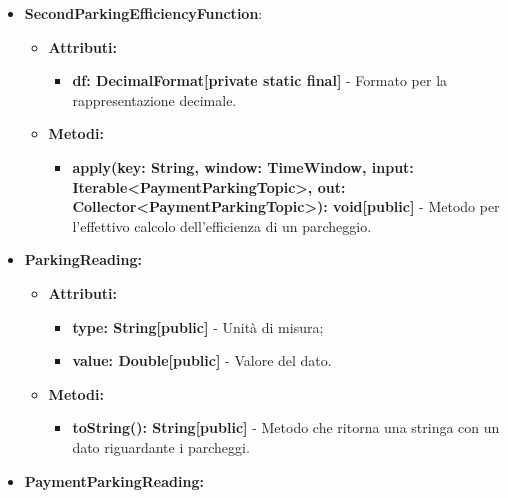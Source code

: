 \documentclass[8pt]{article}
\begin{document}
\begin{itemize}
\begin{itemize}
    \end{itemize}
    \item \textbf{SecondParkingEfficiencyFunction}:
    \begin{itemize}
	\setlength\itemsep{0em}
        \item \textbf{Attributi:}
        \begin{itemize}
	\setlength\itemsep{0em}
            \item \textbf{df: DecimalFormat[private static final]} - Formato per la rappresentazione decimale.
        \end{itemize}
    \end{itemize}
    \begin{itemize}
	\setlength\itemsep{0em}
        \item \textbf{Metodi:}
        \begin{itemize}
	\setlength\itemsep{0em}
            \item \textbf{apply(key: String, window: TimeWindow, input: Iterable<PaymentParkingTopic>, out: Collector<PaymentParkingTopic>): void[public]} - Metodo per l'effettivo calcolo dell'efficienza di un parcheggio.
        \end{itemize}
    \end{itemize}
    \item \textbf{ParkingReading:}
    \begin{itemize}
	\setlength\itemsep{0em}
        \item \textbf{Attributi:}
        \begin{itemize}
	\setlength\itemsep{0em}
            \item \textbf{type: String[public]} - Unità di misura;
            \item \textbf{value: Double[public]} - Valore del dato.
        \end{itemize}
    \end{itemize}
    \begin{itemize}
	\setlength\itemsep{0em}
        \item \textbf{Metodi:}
        \begin{itemize}
	\setlength\itemsep{0em}
            \item \textbf{toString(): String[public]} - Metodo che ritorna una stringa con un dato riguardante i parcheggi.
        \end{itemize}
    \end{itemize}
    \item \textbf{PaymentParkingReading:}
    \begin{itemize}

\end{itemize}
\end{itemize}
\end{document}
